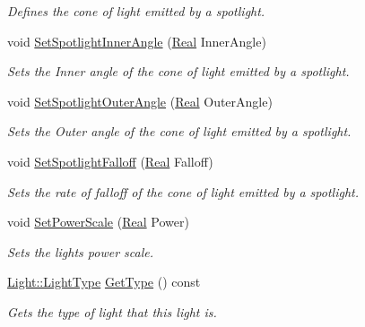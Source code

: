 \begin{DoxyCompactItemize}
\begin{DoxyCompactList}\small\item\em Defines the cone of light emitted by a spotlight. \item\end{DoxyCompactList}\item 
void \hyperlink{classphys_1_1Light_a3b812a0181d08f3c30c9a75f13fd6282}{SetSpotlightInnerAngle} (\hyperlink{namespacephys_af7eb897198d265b8e868f45240230d5f}{Real} InnerAngle)
\begin{DoxyCompactList}\small\item\em Sets the Inner angle of the cone of light emitted by a spotlight. \item\end{DoxyCompactList}\item 
void \hyperlink{classphys_1_1Light_a6cab679dfc15d35e3d3b8b229e602fff}{SetSpotlightOuterAngle} (\hyperlink{namespacephys_af7eb897198d265b8e868f45240230d5f}{Real} OuterAngle)
\begin{DoxyCompactList}\small\item\em Sets the Outer angle of the cone of light emitted by a spotlight. \item\end{DoxyCompactList}\item 
void \hyperlink{classphys_1_1Light_a170e0fc23e3a50587a483fa8981b5486}{SetSpotlightFalloff} (\hyperlink{namespacephys_af7eb897198d265b8e868f45240230d5f}{Real} Falloff)
\begin{DoxyCompactList}\small\item\em Sets the rate of falloff of the cone of light emitted by a spotlight. \item\end{DoxyCompactList}\item 
void \hyperlink{classphys_1_1Light_af4a6428b87c443a33261575783a4fb05}{SetPowerScale} (\hyperlink{namespacephys_af7eb897198d265b8e868f45240230d5f}{Real} Power)
\begin{DoxyCompactList}\small\item\em Sets the lights power scale. \item\end{DoxyCompactList}\item 
\hyperlink{classphys_1_1Light_aef1be63d57f59f33bf4c66be797009bf}{Light::LightType} \hyperlink{classphys_1_1Light_ac404a6c7df9758f8420a8931118f516b}{GetType} () const 
\begin{DoxyCompactList}\small\item\em Gets the type of light that this light is. \item\end{DoxyCompactList}\item 

\end{DoxyCompactItemize}
